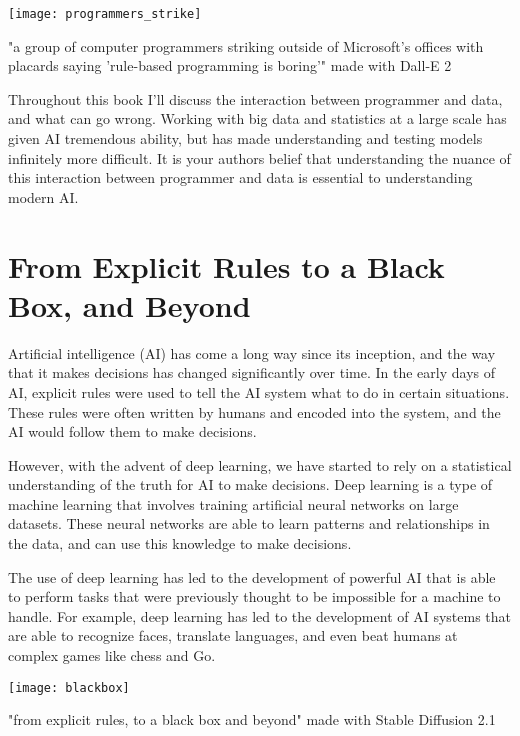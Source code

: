 \begin{marginfigure}[-5.5cm]
        \texttt{[image: programmers\_strike]}
        \caption{"a group of computer programmers striking outside of Microsoft's offices with placards saying 'rule-based programming is boring'" made with Dall-E 2}
\end{marginfigure}

Throughout this book I'll discuss the interaction between programmer and data, and what can go wrong. Working with big data and statistics at a large scale has given AI tremendous ability, but has made understanding and testing models infinitely more difficult. It is your authors belief that understanding the nuance of this interaction between programmer and data is essential to understanding modern AI.

\section{From Explicit Rules to a Black Box, and Beyond}

Artificial intelligence (AI) has come a long way since its inception, and the way that it makes decisions has changed significantly over time. In the early days of AI, explicit rules were used to tell the AI system what to do in certain situations. These rules were often written by humans and encoded into the system, and the AI would follow them to make decisions.

However, with the advent of deep learning, we have started to rely on a statistical understanding of the truth for AI to make decisions. Deep learning is a type of machine learning that involves training artificial neural networks on large datasets. These neural networks are able to learn patterns and relationships in the data, and can use this knowledge to make decisions.

The use of deep learning has led to the development of powerful AI that is able to perform tasks that were previously thought to be impossible for a machine to handle. For example, deep learning has led to the development of AI systems that are able to recognize faces, translate languages, and even beat humans at complex games like chess and Go.

\begin{marginfigure}[-5.5cm]
        \texttt{[image: blackbox]}
        \caption{"from explicit rules, to a black box and beyond" made with Stable Diffusion 2.1}
\end{marginfigure}

